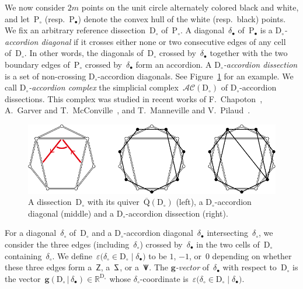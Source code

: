\documentclass{compositio}
\theoremstyle{definition}
\newcommand{\R}{\mathbb{R}} %
\renewcommand{\b}[1]{\mathbf{#1}} %
\newcommand{\fref}[1]{Figure~\ref{#1}} %
\newcommand{\darkblue}{\color{darkblue}} %
\newcommand{\defn}[1]{\textsl{\darkblue #1}} %
\newcommand{\polygon}{\mathrm{P}} %
\newcommand{\dissection}{\mathrm{D}} %
\newcommand{\accordionComplex}{\mathcal{AC}} %
\newcommand{\sign}[3]{\varepsilon \big( {#1} \in {#2}\;|\;{#3} \big)} %
\newcommand{\SSS}{\reflectbox{$\mathsf{Z}$}} %
\newcommand{\ZZZ}{\mathsf{Z}} %
\newcommand{\VVV}{{\mathsf{{V \hspace{-.1686cm} I\,}}}} %
\newcommand{\gvector}[2]{\mathbf{g}(#1 \,|\, #2)} %
\newcommand{\quiver}{\mathrm{Q}} %
\begin{document}
We now consider $2m$ points on the unit circle alternately colored black and white, and let~$\polygon_\circ$ (resp.~$\polygon_\bullet$) denote the convex hull of the white (resp.~black) points.
We fix an arbitrary reference dissection~$\dissection_\circ$ of~$\polygon_\circ$.
A diagonal~$\delta_\bullet$ of~$\polygon_\bullet$ is a \defn{$\dissection_\circ$-accordion diagonal} if it crosses either none or two consecutive edges of any cell of~$\dissection_\circ$.
In other words, the diagonals of~$\dissection_\circ$ crossed by~$\delta_\bullet$ together with the two boundary edges of~$\polygon_\circ$ crossed by~$\delta_\bullet$ form an accordion.
A \defn{$\dissection_\circ$-accordion dissection} is a set of non-crossing \mbox{$\dissection_\circ$-accordion} diagonals. 
See \fref{fig:exmAccordionDissections} for an example.
We call \defn{$\dissection_\circ$-accordion complex} the simplicial complex~$\accordionComplex(\dissection_\circ)$ of $\dissection_\circ$-accordion dissections.
This complex was studied in recent works of F.~Chapoton~\cite{Chapoton-quadrangulations}, A.~Garver and T.~McConville~\cite{GarverMcConville}, and T.~Manneville and V.~Pilaud~\cite{MannevillePilaud-accordion}.

\begin{figure}
	\capstart
	\centerline{\includegraphics[width=.9\textwidth]{exmAccordionDissections}}
	\caption{A dissection~$\dissection_\circ$ with its quiver~$\overline{\quiver}(\dissection_\circ)$ (left), a $\dissection_\circ$-accordion diagonal (middle) and a $\dissection_\circ$-accordion dissection (right).}
	\label{fig:exmAccordionDissections}
\end{figure}

For a diagonal~$\delta_\circ$ of~$\dissection_\circ$ and a $\dissection_\circ$-accordion diagonal~$\delta_\bullet$ intersecting~$\delta_\circ$, we consider the three edges (including~$\delta_\circ$) crossed by~$\delta_\bullet$ in the two cells of~$\dissection_\circ$ containing~$\delta_\circ$. We define~$\sign{\delta_\circ}{\dissection_\circ}{\delta_\bullet}$ to be $1$, $-1$, or~$0$ depending on whether these three edges form a~$\ZZZ$, a~$\SSS$, or a~$\VVV$.
The \defn{$\b{g}$-vector} of~$\delta_\bullet$ with respect to~$\dissection_\circ$ is the vector~$\gvector{\dissection_\circ}{\delta_\bullet} \in \R^{\dissection_\circ}$ whose $\delta_\circ$-coordinate is~$\sign{\delta_\circ}{\dissection_\circ}{\delta_\bullet}$.
\end{document}
